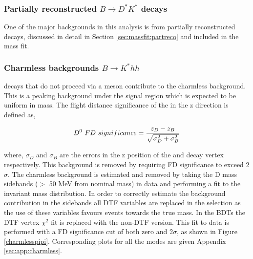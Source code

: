 \subsubsection{Partially reconstructed \boldmath$B \to D^*K^*$ decays}
\label{sec:backgrounds:partreco}

One of the major backgrounds in this analysis is from partially reconstructed \decay{\B}{\Dstar\Kstar} decays, discussed in detail in Section \ref{sec:massfit:partreco} and included in the mass fit.

\subsubsection{Charmless backgrounds \boldmath$B \to K^*hh$}
\label{sec:backgrounds:charmless}

\B decays that do not proceed via a \D meson contribute to the charmless background. This is a peaking background under the signal region which is expected to be uniform in \D mass. The flight distance significance of the \Dz in the z direction is defined as,

\begin{equation}
{\ensuremath{{D}^0}}\ FD\ significance = \frac{z_D - z_B}{\sqrt{\sigma_D^2 + \sigma_B^2}}
\label{FDdefinition}
\end{equation}

where, $\sigma_D$ and $\sigma_B$ are the errors in the z position of the \D and \B decay vertex respectively. This background is removed by requiring \Dz FD significance to exceed 2$\sigma$. The charmless background is estimated and removed by taking the D mass sidebands ($>$ 50 MeV from nominal \D mass) in data and performing a fit to the invariant \B mass distribution. In order to correctly estimate the background contribution in the \D sidebands all DTF variables are replaced in the selection as the use of these variables favours events towards the true \D mass. In the BDTs the DTF vertex $\chi^2$ fit is replaced with the non-DTF version. This fit to data is performed with a FD significance cut of both zero and 2$\sigma$, as shown in Figure \ref{charmlesspipi}. Corresponding plots for all the modes are given Appendix \ref{sec:app:charmless}.

